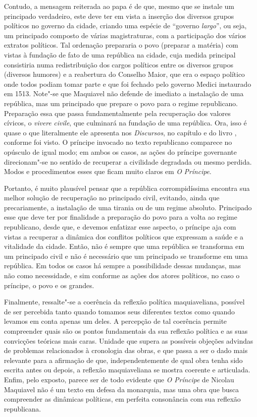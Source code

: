 Contudo, a mensagem reiterada ao papa é de que, mesmo que se instale um
principado verdadeiro, este deve ter em vista a inserção dos diversos
grupos políticos no governo da cidade, criando uma espécie de ``governo
\emph{largo}'', ou seja, um principado composto de várias magistraturas,
com a participação dos vários extratos políticos. Tal ordenação
prepararia o povo (preparar a matéria) com vistas à fundação de fato de
uma república na cidade, cuja medida principal consistiria numa
redistribuição dos cargos políticos entre os diversos grupos (diversos
humores) e a reabertura do Conselho Maior, que era o espaço político
onde todos podiam tomar parte e que foi fechado pelo governo Medici
instaurado em 1513. Note"-se que Maquiavel não defende de imediato a
instalação de uma república, mas um principado que prepare o povo para o
regime republicano. Preparação essa que passa fundamentalmente pela
recuperação dos valores cívicos, o \emph{vivere civile}, que culminará
na fundação de uma república. Ora, isso é quase o que literalmente ele
apresenta nos \emph{Discursos}, no capítulo  e  do livro , conforme
foi visto. O príncipe invocado no texto republicano comparece no
opúsculo de igual modo; em ambos os casos, as ações do príncipe
governante direcionam"-se no sentido de recuperar a civilidade degradada
ou mesmo perdida. Modos e procedimentos esses que ficam muito claros em
\emph{O Príncipe}.

Portanto, é muito plausível pensar que a república corrompidíssima
encontra sua melhor solução de recuperação no principado civil,
evitando, ainda que precariamente, a instalação de uma tirania ou de um
regime absoluto. Principado esse que deve ter por finalidade a
preparação do povo para a volta ao regime republicano, desde que, e
devemos enfatizar esse aspecto, o príncipe aja com vistas a recuperar a
dinâmica dos conflitos políticos que expressam a saúde e a vitalidade da
cidade. Então, não é sempre que uma república se transforma em um
principado civil e não é necessário que um principado se transforme em
uma república. Em todos os casos há sempre a possibilidade dessas
mudanças, mas não como necessidade, e sim conforme as ações dos atores
políticos, no caso o príncipe, o povo e os grandes.

Finalmente, ressalte"-se a coerência da reflexão política maquiaveliana,
possível de ser percebida tanto quando tomamos seus diferentes textos
como quando levamos em conta apenas um deles. A percepção de tal
coerência permite compreender quais são os pontos fundamentais da sua
reflexão política e as suas convicções teóricas mais caras. Unidade que
supera as possíveis objeções advindas de problemas relacionados à
cronologia das obras, e que passa a ser o dado mais relevante para a
afirmação de que, independentemente de qual obra tenha sido escrita
antes ou depois, a reflexão maquiaveliana se mostra coerente e
articulada. Enfim, pelo exposto, parece ser de todo evidente que \emph{O
Príncipe} de Nicolau Maquiavel não é um texto em defesa da monarquia,
mas uma obra que busca compreender as dinâmicas políticas, em perfeita
consonância com sua reflexão republicana.

